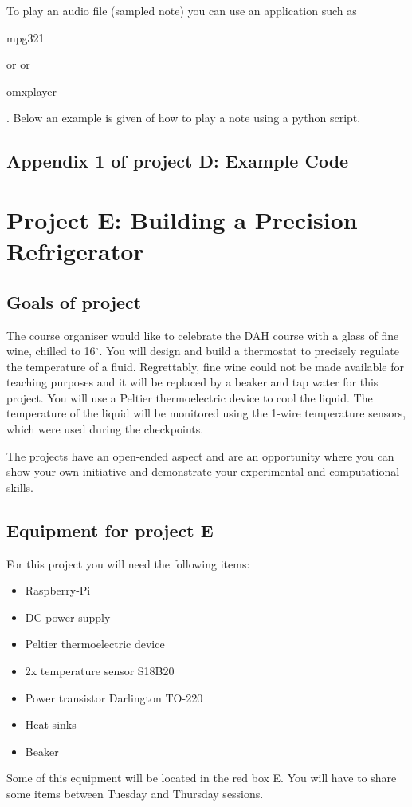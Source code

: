 To play an audio file (sampled note) you can use an application such as \begin{tt}mpg321\end{tt} or or  \begin{tt}omxplayer\end{tt}. Below an example is given of how to play a note using a python script.\\


\vspace*{-0.5cm}




\subsection*{Appendix 1 of project D: Example Code}




\newpage
\section{Project E: Building a Precision Refrigerator}

\subsection{Goals of project}

The course organiser would like to celebrate the DAH course with a glass of fine wine, chilled to 
 16$^\circ .$ You will design and build a thermostat to precisely regulate the temperature of a fluid. Regrettably, fine wine could not be made available for teaching purposes and it will be replaced by a beaker and tap water for this project. You will use a Peltier thermoelectric device to cool the liquid. The temperature of the liquid will be monitored using the 1-wire temperature sensors, which were used during the checkpoints.

The projects have an open-ended aspect and are an opportunity where you can show your own initiative and demonstrate your experimental and computational skills. 

\subsection{Equipment for project E}

For this project you will need the following items:
\begin{itemize}
\item Raspberry-Pi
\item DC power supply
\item Peltier thermoelectric device
\item 2x temperature sensor S18B20
\item Power transistor Darlington TO-220
\item Heat sinks
\item Beaker
\end{itemize}
Some of this equipment will be located in the red box E. You will have to share some items between Tuesday and Thursday sessions. 


